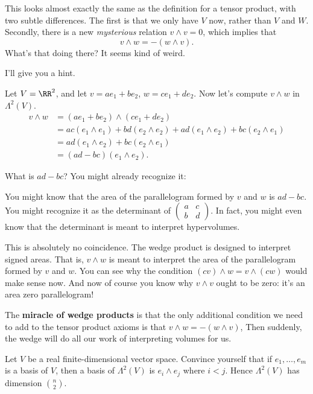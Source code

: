 This looks almost exactly the same as the definition for a tensor product,
with two subtle differences.
The first is that we only have $V$ now, rather than $V$ and $W$.
Secondly, there is a new \emph{mysterious} relation $v \wedge v = 0$,
which implies that
\[ v \wedge w = - (w \wedge v). \]
What's that doing there?
It seems kind of weird.

I'll give you a hint.
\begin{example}
	Let $V = \RR^2$, and let $v = ae_1 + be_2$, $w = ce_1 + de_2$.
	Now let's compute $v \wedge w$ in $\Lambda^2(V)$.
	\begin{align*}
		v \wedge w &= (ae_1 + be_2) \wedge (ce_1 + de_2) \\
		&= ac (e_1 \wedge e_1) + bd (e_2 \wedge e_2)
		+ ad (e_1 \wedge e_2) + bc (e_2 \wedge e_1) \\
		&= ad (e_1 \wedge e_2) + bc (e_2 \wedge e_1) \\
		&= (ad-bc) (e_1 \wedge e_2).
	\end{align*}
\end{example}

What is $ad-bc$? You might already recognize it:
\begin{itemize}
	\ii  You might know that the area of the parallelogram formed by $v$ and $w$ is $ad-bc$.
	\ii You might recognize it as the determinant of $\left(
		\begin{array}{cc}
			a & c \\
			b & d
		\end{array}
		\right)$.
	In fact, you might even know that the determinant is meant to interpret
	hypervolumes.
\end{itemize}
This is absolutely no coincidence.
The wedge product is designed to interpret signed areas.
That is, $v \wedge w$ is meant to interpret the area of the parallelogram
formed by $v$ and $w$.
You can see why the condition $(cv) \wedge w = v \wedge (cw)$ would make sense now.
And now of course you know why $v \wedge v$ ought to be zero:
it's an area zero parallelogram!

The \textbf{miracle of wedge products} is that the only additional condition
we need to add to the tensor product axioms is that $v \wedge w = -(w \wedge v)$,
Then suddenly, the wedge will do all our work of interpreting volumes for us.

\begin{ques}
	Let $V$ be a real finite-dimensional vector space.
	Convince yourself that if $e_1, \dots, e_m$ is a basis of $V$,
	then a basis of $\Lambda^2(V)$ is $e_i \wedge e_j$ where $i < j$.
	Hence $\Lambda^2(V)$ has dimension $\binom n2$.
\end{ques}

